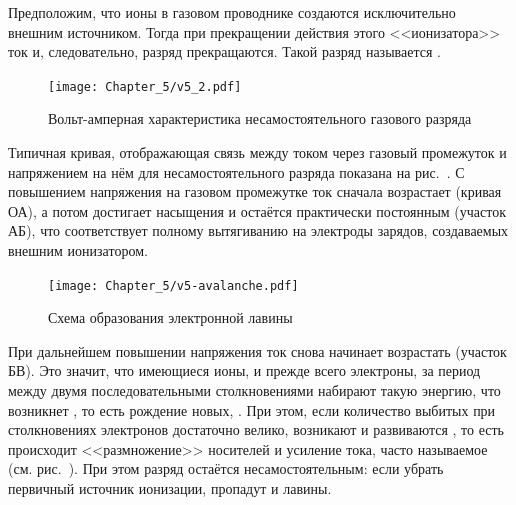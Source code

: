 Предположим, что ионы в газовом проводнике создаются исключительно внешним
источником. Тогда при прекращении действия этого <<ионизатора>> ток и,
следовательно, разряд прекращаются. Такой разряд называется
.

\begin{figure}[h]
    \centering
    \texttt{[image: Chapter\_5/v5\_2.pdf]}
    \caption{Вольт-амперная характеристика несамостоятельного газового разряда}
\end{figure}

Типичная кривая, отображающая связь между током через газовый промежуток и
напряжением на нём для несамостоятельного разряда показана на
рис.~. С повышением напряжения
на газовом промежутке ток сначала возрастает (кривая ОА), а потом достигает
насыщения и остаётся практически постоянным (участок АБ), что соответствует
полному вытягиванию на электроды зарядов, создаваемых внешним ионизатором.

\begin{figure}
\centering
\texttt{[image: Chapter\_5/v5-avalanche.pdf]}
\caption{Схема образования электронной лавины}
\end{figure}

При дальнейшем повышении напряжения ток снова начинает возрастать (участок БВ).
Это значит, что имеющиеся ионы, и прежде всего электроны, за период между двумя
последовательными столкновениями набирают такую энергию, что возникнет
, то есть рождение новых,
. При этом,
если количество выбитых при столкновениях электронов достаточно велико,
возникают и развиваются ,
то есть происходит <<размножение>> носителей и усиление тока,
часто называемое  (см. рис.~).
При этом разряд остаётся несамостоятельным: если убрать первичный источник
ионизации, пропадут и лавины.

